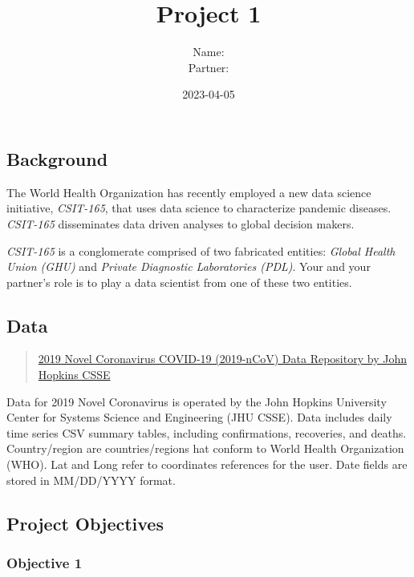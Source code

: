 \documentclass[
]{article}
\title{Project 1}
\author{Name:\\
Partner:}
\date{2023-04-05}
\begin{document}
\maketitle

{
\setcounter{tocdepth}{3}
\tableofcontents
}
\hypertarget{background}{%
\subsection{Background}\label{background}}

The World Health Organization has recently employed a new data science
initiative, \emph{CSIT-165}, that uses data science to characterize
pandemic diseases. \emph{CSIT-165} disseminates data driven analyses to
global decision makers.

\emph{CSIT-165} is a conglomerate comprised of two fabricated entities:
\emph{Global Health Union (GHU)} and \emph{Private Diagnostic
Laboratories (PDL)}. Your and your partner's role is to play a data
scientist from one of these two entities.

\hypertarget{data}{%
\subsection{Data}\label{data}}

\begin{quote}
\href{https://github.com/CSSEGISandData/COVID-19/tree/master/csse_covid_19_data/csse_covid_19_time_series}{2019
Novel Coronavirus COVID-19 (2019-nCoV) Data Repository by John Hopkins
CSSE}
\end{quote}

Data for 2019 Novel Coronavirus is operated by the John Hopkins
University Center for Systems Science and Engineering (JHU CSSE). Data
includes daily time series CSV summary tables, including confirmations,
recoveries, and deaths. Country/region are countries/regions hat conform
to World Health Organization (WHO). Lat and Long refer to coordinates
references for the user. Date fields are stored in MM/DD/YYYY format.

\hypertarget{project-objectives}{%
\subsection{Project Objectives}\label{project-objectives}}

\hypertarget{objective-1}{%
\subsubsection{Objective 1}\label{objective-1}}
\end{document}
